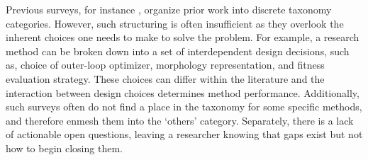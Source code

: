 Previous surveys, for instance \cite{wang2025embodied}, organize prior work into discrete taxonomy categories.
However, such structuring is often insufficient as they overlook the inherent choices one needs to make to solve the problem.
For example, a research method can be broken down into a set of interdependent design decisions, such as, choice of outer-loop optimizer, morphology representation, and fitness evaluation strategy.
These choices can differ within the literature and the interaction between design choices determines method performance.
Additionally, such surveys often do not find a place in the taxonomy for some specific methods, and therefore enmesh them into the `others' category.  
Separately, there is a lack of actionable open questions, leaving a researcher knowing that gaps exist but not how to begin closing them.